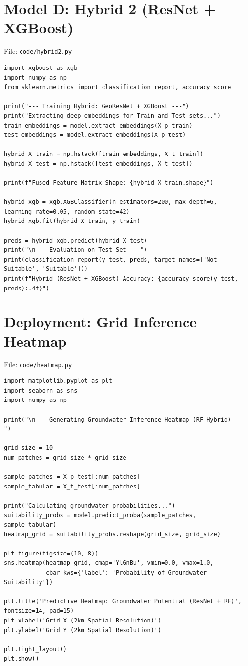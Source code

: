 \documentclass[12pt,a4paper]{report}
\begin{document}
\section{Model D: Hybrid 2 (ResNet + XGBoost)}
\begin{wiseNote}
File: \texttt{code/hybrid2.py}
\end{wiseNote}
\lstset{style=wise,language=Python}
\begin{lstlisting}
import xgboost as xgb
import numpy as np
from sklearn.metrics import classification_report, accuracy_score

print("--- Training Hybrid: GeoResNet + XGBoost ---")
print("Extracting deep embeddings for Train and Test sets...")
train_embeddings = model.extract_embeddings(X_p_train)
test_embeddings = model.extract_embeddings(X_p_test)

hybrid_X_train = np.hstack([train_embeddings, X_t_train])
hybrid_X_test = np.hstack([test_embeddings, X_t_test])

print(f"Fused Feature Matrix Shape: {hybrid_X_train.shape}")

hybrid_xgb = xgb.XGBClassifier(n_estimators=200, max_depth=6, learning_rate=0.05, random_state=42)
hybrid_xgb.fit(hybrid_X_train, y_train)

preds = hybrid_xgb.predict(hybrid_X_test)
print("\n--- Evaluation on Test Set ---")
print(classification_report(y_test, preds, target_names=['Not Suitable', 'Suitable']))
print(f"Hybrid (ResNet + XGBoost) Accuracy: {accuracy_score(y_test, preds):.4f}")
\end{lstlisting}

\section{Deployment: Grid Inference Heatmap}
\begin{wiseNote}
File: \texttt{code/heatmap.py} 
\end{wiseNote}
\lstset{style=wise,language=Python}
\begin{lstlisting}
import matplotlib.pyplot as plt
import seaborn as sns
import numpy as np

print("\n--- Generating Groundwater Inference Heatmap (RF Hybrid) ---")

grid_size = 10
num_patches = grid_size * grid_size

sample_patches = X_p_test[:num_patches]
sample_tabular = X_t_test[:num_patches]

print("Calculating groundwater probabilities...")
suitability_probs = model.predict_proba(sample_patches, sample_tabular)
heatmap_grid = suitability_probs.reshape(grid_size, grid_size)

plt.figure(figsize=(10, 8))
sns.heatmap(heatmap_grid, cmap='YlGnBu', vmin=0.0, vmax=1.0, 
            cbar_kws={'label': 'Probability of Groundwater Suitability'})

plt.title('Predictive Heatmap: Groundwater Potential (ResNet + RF)', fontsize=14, pad=15)
plt.xlabel('Grid X (2km Spatial Resolution)')
plt.ylabel('Grid Y (2km Spatial Resolution)')

plt.tight_layout()
plt.show()
\end{lstlisting}
\end{document}
